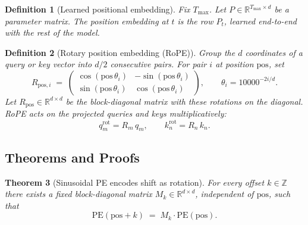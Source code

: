 \documentclass[11pt]{article}
\newtheorem{theorem}{Theorem}[section]
\newtheorem{definition}[theorem]{Definition}
\theoremstyle{remark}
\begin{document}
\begin{definition}[Learned positional embedding]
Fix $T_{\max}$. Let $P \in \mathbb{R}^{T_{\max} \times d}$ be a parameter matrix. The position embedding at $t$ is the row $P_t$, learned end-to-end with the rest of the model.
\end{definition}

\begin{definition}[Rotary position embedding (RoPE)]
Group the $d$ coordinates of a query or key vector into $d/2$ consecutive pairs. For pair $i$ at position $\mathrm{pos}$, set
\[
R_{\mathrm{pos}, i} \;=\; \begin{pmatrix} \cos(\mathrm{pos}\,\theta_i) & -\sin(\mathrm{pos}\,\theta_i) \\ \sin(\mathrm{pos}\,\theta_i) & \cos(\mathrm{pos}\,\theta_i) \end{pmatrix},
\qquad \theta_i = 10000^{-2i/d}.
\]
Let $R_{\mathrm{pos}} \in \mathbb{R}^{d \times d}$ be the block-diagonal matrix with these rotations on the diagonal. RoPE acts on the projected queries and keys multiplicatively:
\[
q_m^{\mathrm{rot}} = R_m\, q_m, \qquad k_n^{\mathrm{rot}} = R_n\, k_n.
\]
\end{definition}

\subsection*{Theorems and Proofs}

\begin{theorem}[Sinusoidal PE encodes shift as rotation]
\label{thm:sinusoidal-shift}
For every offset $k \in \mathbb{Z}$ there exists a fixed block-diagonal matrix $M_k \in \mathbb{R}^{d \times d}$, independent of $\mathrm{pos}$, such that
\[
\mathrm{PE}(\mathrm{pos} + k) \;=\; M_k \cdot \mathrm{PE}(\mathrm{pos}).
\]
\end{theorem}
\end{document}
